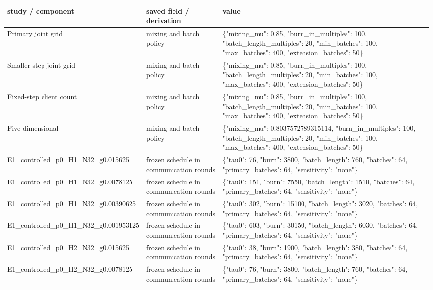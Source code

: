 \begin{tabular}{lll}
study / component & saved field / derivation & value \\
\hline
Primary joint grid & mixing and batch policy & \{"mixing\_mu": 0.85, "burn\_in\_multiples": 100, "batch\_length\_multiples": 20, "min\_batches": 100, "max\_batches": 400, "extension\_batches": 50\} \\
Smaller-step joint grid & mixing and batch policy & \{"mixing\_mu": 0.85, "burn\_in\_multiples": 100, "batch\_length\_multiples": 20, "min\_batches": 100, "max\_batches": 400, "extension\_batches": 50\} \\
Fixed-step client count & mixing and batch policy & \{"mixing\_mu": 0.85, "burn\_in\_multiples": 100, "batch\_length\_multiples": 20, "min\_batches": 100, "max\_batches": 400, "extension\_batches": 50\} \\
Five-dimensional & mixing and batch policy & \{"mixing\_mu": 0.8037572789315114, "burn\_in\_multiples": 100, "batch\_length\_multiples": 20, "min\_batches": 100, "max\_batches": 400, "extension\_batches": 50\} \\
E1\_controlled\_p0\_H1\_N32\_g0.015625 & frozen schedule in communication rounds & \{"tau0": 76, "burn": 3800, "batch\_length": 760, "batches": 64, "primary\_batches": 64, "sensitivity": "none"\} \\
E1\_controlled\_p0\_H1\_N32\_g0.0078125 & frozen schedule in communication rounds & \{"tau0": 151, "burn": 7550, "batch\_length": 1510, "batches": 64, "primary\_batches": 64, "sensitivity": "none"\} \\
E1\_controlled\_p0\_H1\_N32\_g0.00390625 & frozen schedule in communication rounds & \{"tau0": 302, "burn": 15100, "batch\_length": 3020, "batches": 64, "primary\_batches": 64, "sensitivity": "none"\} \\
E1\_controlled\_p0\_H1\_N32\_g0.001953125 & frozen schedule in communication rounds & \{"tau0": 603, "burn": 30150, "batch\_length": 6030, "batches": 64, "primary\_batches": 64, "sensitivity": "none"\} \\
E1\_controlled\_p0\_H2\_N32\_g0.015625 & frozen schedule in communication rounds & \{"tau0": 38, "burn": 1900, "batch\_length": 380, "batches": 64, "primary\_batches": 64, "sensitivity": "none"\} \\
E1\_controlled\_p0\_H2\_N32\_g0.0078125 & frozen schedule in communication rounds & \{"tau0": 76, "burn": 3800, "batch\_length": 760, "batches": 64, "primary\_batches": 64, "sensitivity": "none"\} \\

\end{tabular}
